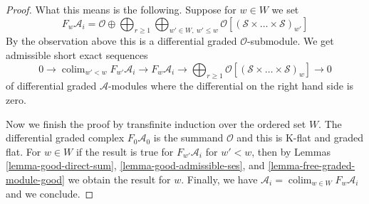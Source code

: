 \documentclass[10pt,a4paper]{amsart}
\theoremstyle{plain}
\theoremstyle{definition}
\theoremstyle{remark}
\numberwithin{equation}{subsection}
\def\colim{\mathop{\mathrm{colim}}\nolimits}
\begin{document}
\begin{proof}
\medskip\noindent
What this means is the following. Suppose for $w \in W$ we set
$$
F_w \mathcal{A}_i = \mathcal{O} \oplus \bigoplus\nolimits_{r \geq 1}
\bigoplus\nolimits_{w' \in W,\ w' \leq w}
\mathcal{O}[\left(\mathcal{S} \times \ldots \times \mathcal{S}\right)_{w'}]
$$
By the observation above this is a differential graded $\mathcal{O}$-submodule.
We get admissible short exact sequences
$$
0 \to \colim_{w' < w} F_{w'}\mathcal{A}_i \to
F_w\mathcal{A}_i \to
\bigoplus\nolimits_{r \geq 1}
\mathcal{O}[\left(\mathcal{S} \times \ldots \times \mathcal{S}\right)_w]
\to 0
$$
of differential graded $\mathcal{A}$-modules where the differential
on the right hand side is zero.

\medskip\noindent
Now we finish the proof by transfinite induction over the ordered
set $W$. The differential graded complex $F_0\mathcal{A}_0$ is
the summand $\mathcal{O}$ and this is K-flat and graded flat.
For $w \in W$ if the result is true for $F_{w'}\mathcal{A}_i$
for $w' < w$, then by Lemmas \ref{lemma-good-direct-sum},
\ref{lemma-good-admissible-ses}, and \ref{lemma-free-graded-module-good}
we obtain the result for $w$. Finally, we have
$\mathcal{A}_i = \colim_{w \in W} F_w\mathcal{A}_i$ and
we conclude.
\end{proof}
\end{document}
